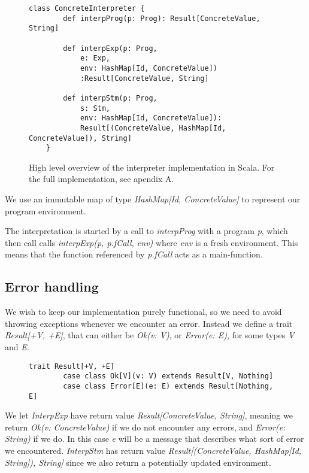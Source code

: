 \begin{figure}[!h]
	\begin{lstlisting}[style=simple]
	class ConcreteInterpreter {
		def interpProg(p: Prog): Result[ConcreteValue, String]
			
		def interpExp(p: Prog,
			e: Exp, 
			env: HashMap[Id, ConcreteValue])
			:Result[ConcreteValue, String]
						  
		def interpStm(p: Prog,
			s: Stm,
			env: HashMap[Id, ConcreteValue]):
			Result[(ConcreteValue, HashMap[Id, ConcreteValue]), String]
	}
	\end{lstlisting}
	\caption{High level overview of the interpreter implementation in Scala. For the full implementation, see apendix A.}
\end{figure}
\newpage
We use an immutable map of type \textsl{HashMap[Id, ConcreteValue]} to represent our program environment.

The interpretation is started by a call to \textsl{interpProg} with a program \textsl{p}, which then call calls \textsl{interpExp(p, p.fCall, env)} where \textsl{env} is a fresh environment. This means that the function referenced by \textsl{p.fCall} acts as a main-function. 

\subsection{Error handling}
We wish to keep our implementation purely functional, so we need to avoid throwing exceptions whenever we encounter an error. Instead we define a trait \textsl{Result[+V, +E]}, that can either be \textsl{Ok(v: V)},  or \textsl{Error(e: E)}, for some types \textsl{V} and \textsl{E}.

\begin{figure}[!h]
	\begin{lstlisting}[style=simple]
		trait Result[+V, +E]
		case class Ok[V](v: V) extends Result[V, Nothing]
		case class Error[E](e: E) extends Result[Nothing, E]
	\end{lstlisting}
\end{figure}

We let \textsl{InterpExp} have return value \textsl{Result[ConcreteValue, String]}, meaning we return \textsl{Ok(v: ConcreteValue)} if we do not encounter any errors, and \textsl{Error(e: String)} if we do. In this case \textsl{e} will be a message that describes what sort of error we encountered. \textsl{InterpStm} has return value 
 \textsl{Result[(ConcreteValue, HashMap[Id, String]), String]} since we also return a potentially updated environment. 

